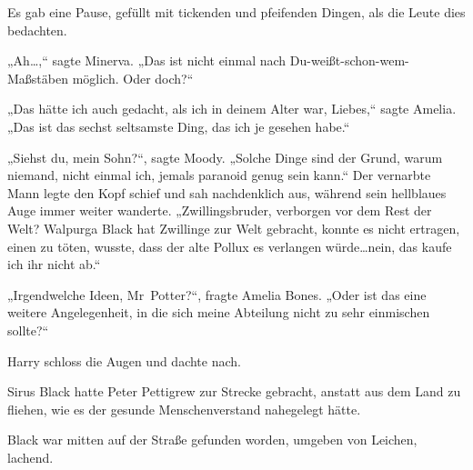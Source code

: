 Es gab eine Pause, gefüllt mit tickenden und pfeifenden Dingen, als die Leute dies bedachten.

„Ah…,“ sagte Minerva. „Das ist nicht einmal nach Du-weißt-schon-wem-Maßstäben möglich. Oder doch?“

„Das hätte ich auch gedacht, als ich in deinem Alter war, Liebes,“ sagte Amelia. „Das ist das sechst seltsamste Ding, das ich je gesehen habe.“

„Siehst du, mein Sohn?“, sagte Moody. „Solche Dinge sind der Grund, warum niemand, nicht einmal ich, jemals paranoid genug sein kann.“
Der vernarbte Mann legte den Kopf schief und sah nachdenklich aus, während sein hellblaues Auge immer weiter wanderte.
„Zwillingsbruder, verborgen vor dem Rest der Welt? Walpurga Black hat Zwillinge zur Welt gebracht, konnte es nicht ertragen, einen zu töten, wusste, dass der alte Pollux es verlangen würde…nein, das kaufe ich ihr nicht ab.“

„Irgendwelche Ideen, Mr~Potter?“, fragte Amelia Bones. „Oder ist das eine weitere Angelegenheit, in die sich meine Abteilung nicht zu sehr einmischen sollte?“

Harry schloss die Augen und dachte nach.

Sirus Black hatte Peter Pettigrew zur Strecke gebracht, anstatt aus dem Land zu fliehen, wie es der gesunde Menschenverstand nahegelegt hätte.

Black war mitten auf der Straße gefunden worden, umgeben von Leichen, lachend.

